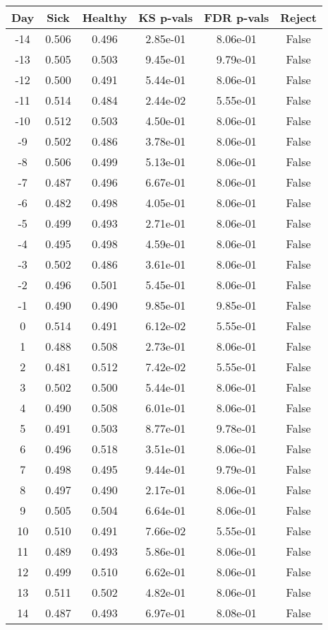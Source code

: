 \begin{tabular}{c|c|c|c|c|c}
Day &  Sick & Healthy &  KS p-vals & FDR p-vals & Reject\\
\hline
-14 & 0.506 &   0.496 &   2.85e-01 &   8.06e-01 &  False\\
-13 & 0.505 &   0.503 &   9.45e-01 &   9.79e-01 &  False\\
-12 & 0.500 &   0.491 &   5.44e-01 &   8.06e-01 &  False\\
-11 & 0.514 &   0.484 &   2.44e-02 &   5.55e-01 &  False\\
-10 & 0.512 &   0.503 &   4.50e-01 &   8.06e-01 &  False\\
 -9 & 0.502 &   0.486 &   3.78e-01 &   8.06e-01 &  False\\
 -8 & 0.506 &   0.499 &   5.13e-01 &   8.06e-01 &  False\\
 -7 & 0.487 &   0.496 &   6.67e-01 &   8.06e-01 &  False\\
 -6 & 0.482 &   0.498 &   4.05e-01 &   8.06e-01 &  False\\
 -5 & 0.499 &   0.493 &   2.71e-01 &   8.06e-01 &  False\\
 -4 & 0.495 &   0.498 &   4.59e-01 &   8.06e-01 &  False\\
 -3 & 0.502 &   0.486 &   3.61e-01 &   8.06e-01 &  False\\
 -2 & 0.496 &   0.501 &   5.45e-01 &   8.06e-01 &  False\\
 -1 & 0.490 &   0.490 &   9.85e-01 &   9.85e-01 &  False\\
  0 & 0.514 &   0.491 &   6.12e-02 &   5.55e-01 &  False\\
  1 & 0.488 &   0.508 &   2.73e-01 &   8.06e-01 &  False\\
  2 & 0.481 &   0.512 &   7.42e-02 &   5.55e-01 &  False\\
  3 & 0.502 &   0.500 &   5.44e-01 &   8.06e-01 &  False\\
  4 & 0.490 &   0.508 &   6.01e-01 &   8.06e-01 &  False\\
  5 & 0.491 &   0.503 &   8.77e-01 &   9.78e-01 &  False\\
  6 & 0.496 &   0.518 &   3.51e-01 &   8.06e-01 &  False\\
  7 & 0.498 &   0.495 &   9.44e-01 &   9.79e-01 &  False\\
  8 & 0.497 &   0.490 &   2.17e-01 &   8.06e-01 &  False\\
  9 & 0.505 &   0.504 &   6.64e-01 &   8.06e-01 &  False\\
 10 & 0.510 &   0.491 &   7.66e-02 &   5.55e-01 &  False\\
 11 & 0.489 &   0.493 &   5.86e-01 &   8.06e-01 &  False\\
 12 & 0.499 &   0.510 &   6.62e-01 &   8.06e-01 &  False\\
 13 & 0.511 &   0.502 &   4.82e-01 &   8.06e-01 &  False\\
 14 & 0.487 &   0.493 &   6.97e-01 &   8.08e-01 &  False\\
\end{tabular}